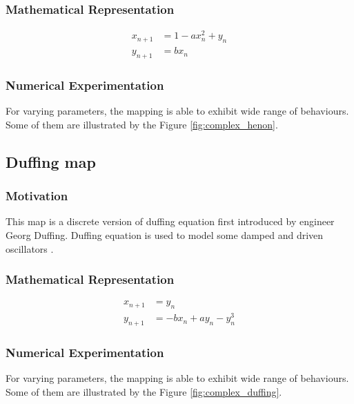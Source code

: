 \subsubsection{Mathematical Representation}
\begin{equation}
\begin{split}
    x_{n+1} &=  1 - a x_{n}^2 + y_{n} \\
    y_{n+1} &=  b x_{n}
\end{split}
\end{equation}

\subsubsection{Numerical Experimentation}
For varying parameters, the mapping is able to exhibit wide range of behaviours.
Some of them are illustrated by the Figure \ref{fig:complex_henon}.

\subsection{Duffing map}

\subsubsection{Motivation}

This map is a discrete version of duffing equation first introduced by engineer Georg Duffing.
Duffing equation is used to model some damped and driven oscillators \cite{Urrea2022}.


\subsubsection{Mathematical Representation}
\begin{equation}
\begin{split}
    x_{n+1} &=  y_{n} \\
    y_{n+1} &=  -b x_{n} + a y_{n} - y_{n}^3
\end{split}
\end{equation}

\subsubsection{Numerical Experimentation}
For varying parameters, the mapping is able to exhibit wide range of behaviours.
Some of them are illustrated by the Figure \ref{fig:complex_duffing}.

\endinput